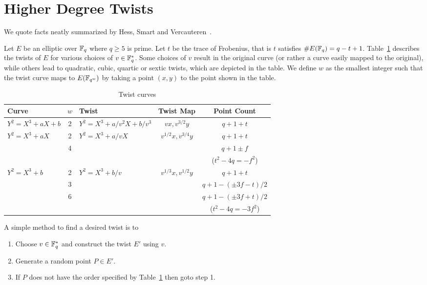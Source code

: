 \section {Higher Degree Twists}

We quote facts neatly summarized by
Hess, Smart and Vercauteren~\cite{hsv}.

Let $E$ be an elliptic over $\mathbb{F}_q$ where $q\ge 5$ is prime.
Let $t$ be the trace of Frobenius, that
is $t$ satisfies $\#E(\mathbb{F}_q) = q-t+1$.
Table~\ref{tbl:twistcurves}
describes the twists of $E$
for various choices of $v \in \mathbb{F}_q^*$.
Some choices of $v$ result in
the original curve (or rather a curve easily mapped to the original),
while others lead to quadratic, cubic, quartic or sextic twists, which are
depicted in the table.
We define $w$ as the smallest integer such that the twist curve
maps to $E(\mathbb{F}_{q^w})$ by taking a point $(x,y)$ to the point shown in the table.

\begin{table}
\begin{center}
\begin{tabular}{|l|c|l|c|c|}

  \hline
  Curve & $w$ & Twist & Twist Map & Point Count \\
  \hline
  $Y^2 = X^3 + a X + b$ & 2 &
  $Y^2 = X^3 + a / v^2 X + b / v^3$ &
  $v x, v^{3/2} y$ &
  $q + 1 + t$ \\
  \hline
  $Y^2 = X^3 + a X$ & 2 &
  $Y^2 = X^3 + a / v X$ &
  $v^{1/2} x, v^{3/4} y$ &
  $q + 1 + t$ \\
  & 4 & & & $q + 1 \pm f$ \\
  & & & & ($t^2 - 4q = -f^2$) \\
  \hline
  $Y^2 = X^3 + b$ & 2 &
  $Y^2 = X^3 + b / v$ &
  $v^{1/3} x, v^{1/2} y$ &
  $q + 1 + t$ \\
  & 3 & & & $q + 1 - (\pm 3f - t)/2$ \\
  & 6 & & & $q + 1 - (\pm 3f + t)/2$ \\
  & & & & ($t^2 - 4q = - 3f^2$) \\
  \hline
\end{tabular}
\end{center}
\caption{\label{tbl:twistcurves}
    Twist curves
}
\end{table}

A simple method to find a desired twist is to

\begin{enumerate}
\item Choose $v \in \mathbb{F}_q^{*}$ and construct the twist $E'$ using $v$.
\item Generate a random point $P \in E'$.
\item If $P$ does not have the order specified by Table~\ref{tbl:twistcurves}
then goto step 1.
\end{enumerate}

